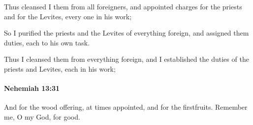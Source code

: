 			\begin{versebox}
					\item[BHS] 
					\item[LXX] 
					\item[ASV] Thus cleansed I them from all foreigners, and appointed charges for the priests and for the Levites, every one in his work;
					\item[NIV] So I purified the priests and the Levites of everything foreign, and assigned them duties, each to his own task.
					\item[NRSV] Thus I cleansed them from everything foreign, and I established the duties of the priests and Levites, each in his work;
			\end{versebox}

		\paragraph{Nehemiah 13:31} %
			\label{NEHEMIAH-13-31}

			And for the wood offering, at times appointed, and for the firstfruits. Remember me, O my God, for good.

